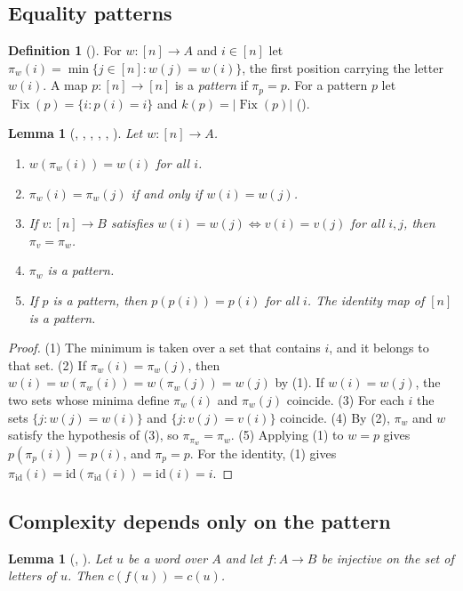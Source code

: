 \documentclass[11pt]{amsart}
\theoremstyle{plain}
\newtheorem{lemma}[theorem]{Lemma}
\theoremstyle{definition}
\newtheorem{definition}[theorem]{Definition}
\newcommand{\Fix}{\operatorname{Fix}}
\begin{document}
\subsection{Equality patterns}

\begin{definition}[]
For $w\colon[n]\to A$ and $i\in[n]$ let $\pi_w(i)=\min\{j\in[n]: w(j)=w(i)\}$, the first position carrying the letter $w(i)$. A map $p\colon[n]\to[n]$ is a \emph{pattern} if $\pi_p=p$. For a pattern $p$ let $\Fix(p)=\{i: p(i)=i\}$ and $k(p)=|\Fix(p)|$ ().
\end{definition}

\begin{lemma}[, , , , , ]\label{lem:pat}
Let $w\colon[n]\to A$.
\begin{enumerate}
\item $w(\pi_w(i))=w(i)$ for all $i$.
\item $\pi_w(i)=\pi_w(j)$ if and only if $w(i)=w(j)$.
\item If $v\colon[n]\to B$ satisfies $w(i)=w(j)\Leftrightarrow v(i)=v(j)$ for all $i,j$, then $\pi_v=\pi_w$.
\item $\pi_w$ is a pattern.
\item If $p$ is a pattern, then $p(p(i))=p(i)$ for all $i$. The identity map of $[n]$ is a pattern.
\end{enumerate}
\end{lemma}

\begin{proof}
(1) The minimum is taken over a set that contains $i$, and it belongs to that set.
(2) If $\pi_w(i)=\pi_w(j)$, then $w(i)=w(\pi_w(i))=w(\pi_w(j))=w(j)$ by (1). If $w(i)=w(j)$, the two sets whose minima define $\pi_w(i)$ and $\pi_w(j)$ coincide.
(3) For each $i$ the sets $\{j:w(j)=w(i)\}$ and $\{j:v(j)=v(i)\}$ coincide.
(4) By (2), $\pi_w$ and $w$ satisfy the hypothesis of (3), so $\pi_{\pi_w}=\pi_w$.
(5) Applying (1) to $w=p$ gives $p(\pi_p(i))=p(i)$, and $\pi_p=p$. For the identity, (1) gives $\pi_{\mathrm{id}}(i)=\mathrm{id}(\pi_{\mathrm{id}}(i))=\mathrm{id}(i)=i$.
\end{proof}

\subsection{Complexity depends only on the pattern}

\begin{lemma}[, ]\label{lem:map}
Let $u$ be a word over $A$ and let $f\colon A\to B$ be injective on the set of letters of $u$. Then $c(f(u))=c(u)$.
\end{lemma}
\end{document}

